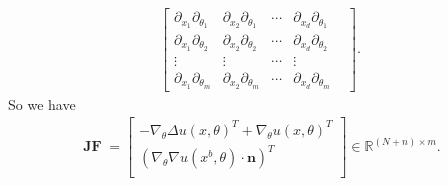 \documentclass[a4paper, 11pt]{article}
\numberwithin{equation}{section}
\begin{document}
\begin{align}
\begin{bmatrix}
\partial_{x_1} \partial_{\theta_1} & \partial_{x_2} \partial_{\theta_1} &\cdots & \partial_{x_d} \partial_{\theta_1} & \\
\partial_{x_1} \partial_{\theta_2} & \partial_{x_2} \partial_{\theta_2} &\cdots & \partial_{x_d} \partial_{\theta_2} & \\
\vdots                                           &                                          \vdots &\cdots &
                                          \vdots &\\
\partial_{x_1} \partial_{\theta_m} & \partial_{x_2} \partial_{\theta_m} &\cdots & \partial_{x_d} \partial_{\theta_m} & 
\end{bmatrix}.
\end{align}
So we have 
\begin{align}
\boldsymbol{\operatorname{JF}} =
\begin{bmatrix}
 -\nabla_{\theta} \Delta u(x,\theta)^{T} + \nabla_{\theta} u(x,\theta)^{T}  \\
\left(\nabla_{\theta} \nabla u(x^b,\theta)\cdot \boldsymbol{n}\right)^{T} \\
\end{bmatrix}
\in \mathbb{R}^{(N+n)\times m}.
\end{align}
\end{document}
